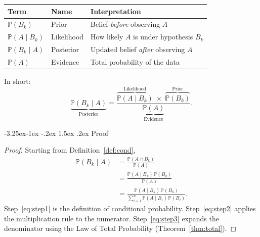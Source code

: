 \documentclass{article}
\makeatletter
\theoremstyle{remark}
\newlength{\subsecindent}
\renewcommand\subsection{\@startsection{subsection}{2}{\subsecindent}%
  {-3.25ex\@plus -1ex \@minus -.2ex}%
  {1.5ex \@plus .2ex}%
  {\normalfont\large\bfseries}}
\newenvironment{sub}{%
  \begin{list}{}{%
    \setlength{\leftmargin}{4em}%
    \setlength{\rightmargin}{0pt}%
    \setlength{\topsep}{0pt}%
    \setlength{\partopsep}{0pt}%
    \setlength{\parsep}{\parskip}%
    \setlength{\itemsep}{\parskip}%
  }\item\relax
}{\end{list}}
\newcommand{\Prob}{\mathbb{P}}
\newcommand{\given}{\mid}
\makeatother
\begin{document}
\begin{sub}
\begin{center}
  \begin{tabular}{lll}
    \toprule
    \textbf{Term} & \textbf{Name} & \textbf{Interpretation} \\
    \midrule
    $\Prob(B_k)$          & Prior       & Belief \emph{before} observing $A$ \\
    $\Prob(A \given B_k)$ & Likelihood  & How likely $A$ is under hypothesis $B_k$ \\
    $\Prob(B_k \given A)$ & Posterior   & Updated belief \emph{after} observing $A$ \\
    $\Prob(A)$            & Evidence    & Total probability of the data \\
    \bottomrule
  \end{tabular}
\end{center}

In short:
\[
  \underbrace{\Prob(B_k \given A)}_{\text{Posterior}}
  = \frac{
      \overbrace{\Prob(A \given B_k)}^{\text{Likelihood}}
      \;\times\;
      \overbrace{\Prob(B_k)}^{\text{Prior}}
    }{
      \underbrace{\Prob(A)}_{\text{Evidence}}
    }.
\]

\end{sub}

\subsection{Proof}
\label{sec:proof}
\begin{sub}

\begin{proof}
  Starting from Definition~\ref{def:cond},
  \begin{align}
    \Prob(B_k \given A)
      &= \frac{\Prob(A \cap B_k)}{\Prob(A)}
         \label{eq:step1} \\[6pt]
      &= \frac{\Prob(A \given B_k)\,\Prob(B_k)}{\Prob(A)}
         \label{eq:step2} \\[6pt]
      &= \frac{\Prob(A \given B_k)\,\Prob(B_k)}
              {\displaystyle\sum_{i=1}^{n}
               \Prob(A \given B_i)\,\Prob(B_i)}.
         \label{eq:step3}
  \end{align}
  Step~\eqref{eq:step1} is the definition of conditional probability.
  Step~\eqref{eq:step2} applies the multiplication rule to the numerator.
  Step~\eqref{eq:step3} expands the denominator using the Law of Total
  Probability (Theorem~\ref{thm:total}).
\end{proof}

\end{sub}
\end{document}
